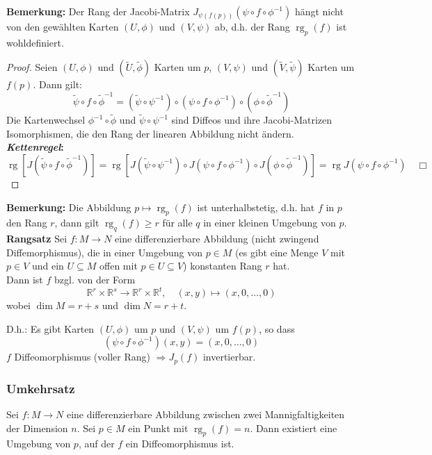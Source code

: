 \documentclass[fleqn, 12pt, letterpaper]{article}
\begin{document}
\textbf{Bemerkung:} Der Rang der Jacobi-Matrix $J_{\psi(f(p))}(\psi \circ f \circ \phi^{-1})$ hängt nicht von den gewählten Karten $(U,\phi)$ und $(V,\psi)$ ab, d.h. der Rang $\operatorname{rg}_p(f)$ ist wohldefiniert.
\begin{proof}
  Seien $(U, \phi)$ und $(\tilde{U}, \tilde{\phi})$ Karten um $p$, $(V, \psi)$ und $(\tilde{V}, \tilde{\psi})$ Karten um $f(p)$. Dann gilt:
  \[
  \tilde{\psi} \circ f \circ \tilde{\phi}^{-1} = (\tilde{\psi}  \circ\psi^{-1}) \circ (\psi\circ f\circ\phi^{-1}) \circ   (\phi\circ\tilde{\phi}^{-1})
  \]
  Die Kartenwechsel $\phi^{-1}\circ\tilde{\phi}$ und $\tilde{\psi}\circ\psi^{-1}$ sind Diffeos und ihre Jacobi-Matrizen Isomorphismen, die den Rang der linearen Abbildung nicht ändern.\\
  \textbf{\textit{Kettenregel}:}
 \[
 \operatorname{rg} \left[ J \left( \tilde{\psi} \circ f \circ   \tilde{\phi}^{-1} \right) \right]
 = \operatorname{rg} \left[ J(\tilde{\psi}\circ\psi^{-1}) \circ J(\psi\circ f\circ\phi^{-1}) \circ J(\phi\circ\tilde{\phi}^{-1}) \right] = \operatorname{rg} J(\psi\circ f\circ\phi^{-1}) \quad \Box
 \]
\end{proof}


\textbf{Bemerkung:} Die Abbildung $p \mapsto \operatorname{rg}_p(f)$ ist unterhalbstetig, d.h. hat $f$ in $p$ den Rang $r$, dann gilt $\operatorname{rg}_q(f) \geq r$ für alle $q$ in einer kleinen Umgebung von $p$.\\

\textbf{Rangsatz}
Sei $f : M \to N$ eine differenzierbare Abbildung (nicht zwingend Diffemorphismus), die in einer Umgebung von $p \in M$ (es gibt eine Menge $V$ mit $p\in V$ und ein $U\subseteq M$ offen mit $p\in U\subseteq V$) konstanten Rang $r$ hat.\\
Dann ist $f$ bzgl. \textit{} von der Form
\[
\mathbb{R}^r \times \mathbb{R}^s \longrightarrow \mathbb{R}^r \times \mathbb{R}^t, \quad (x,y) \mapsto (x, 0, \dots, 0)
\]
wobei $\dim M = r + s$ und $\dim N = r + t$.

D.h.: Es gibt Karten $(U,\phi)$ um $p$ und $(V,\psi)$ um $f(p)$, so dass
\[
(\psi \circ f \circ \phi^{-1})(x, y) = (x,0,\dots,0)
\]
$f$ Diffeomorphismus (voller Rang) $\Rightarrow J_p(f)$ invertierbar.

\subsubsection*{Umkehrsatz}
Sei $f : M \to N$ eine differenzierbare Abbildung zwischen zwei Mannigfaltigkeiten der Dimension $n$. Sei $p \in M$ ein Punkt mit $\operatorname{rg}_p(f) = n$. Dann existiert eine Umgebung von $p$, auf der $f$ ein Diffeomorphismus ist.\\
\end{document}
